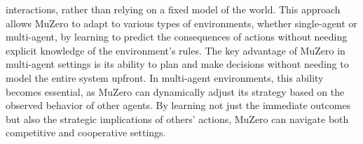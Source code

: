 interactions, rather than relying on a fixed model of the world. This approach
allows MuZero to adapt to various types of environments, whether single-agent
or multi-agent, by learning to predict the consequences of actions without
needing explicit knowledge of the environment’s rules. The key advantage of
MuZero in multi-agent settings is its ability to plan and make decisions
without needing to model the entire system upfront. In multi-agent
environments, this ability becomes essential, as MuZero can dynamically adjust
its strategy based on the observed behavior of other agents. By learning not
just the immediate outcomes but also the strategic implications of others'
actions, MuZero can navigate both competitive and cooperative settings.